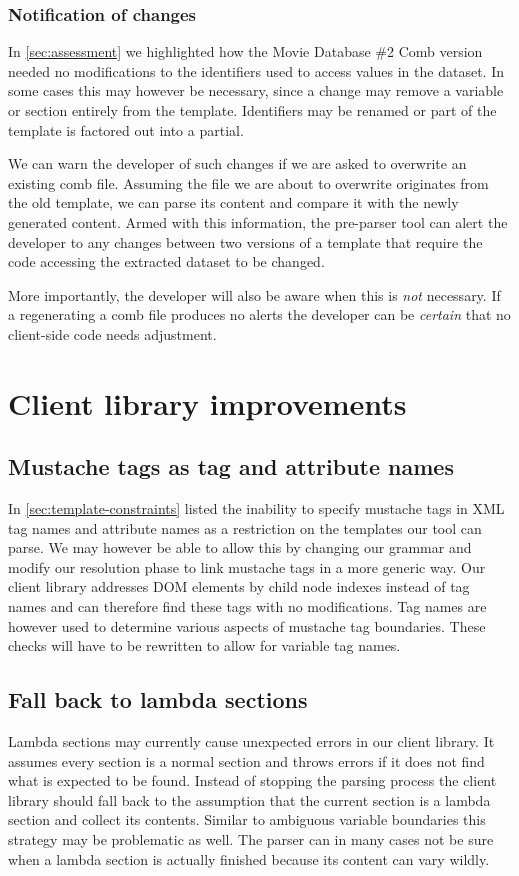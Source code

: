 \documentclass[thesis.tex]{subfiles}
\begin{document}
\subsubsection{Notification of changes}
In \ref{sec:assessment} we highlighted how the Movie Database \#2 Comb version
needed no modifications to the identifiers used to access values in the dataset.
In some cases this may however be necessary, since a change may remove
a variable or section entirely from the template. Identifiers may be renamed or
part of the template is factored out into a partial.

We can warn the developer of such changes if we are asked to overwrite an
existing comb file. Assuming the file we are about to overwrite originates from
the old template, we can parse its content and compare it with the newly
generated content. Armed with this information, the pre-parser tool can alert
the developer to any changes between two versions of a template that require the
code accessing the extracted dataset to be changed.

More importantly, the developer will also be aware when this is \emph{not}
necessary. If a regenerating a comb file produces no alerts the developer can
be \emph{certain} that no client-side code needs adjustment.




\section{Client library improvements}

\subsection{Mustache tags as tag and attribute names}
In \ref{sec:template-constraints} listed the inability to specify mustache
tags in XML tag names and attribute names as a restriction on the templates our
tool can parse. We may however be able to allow this by changing our grammar and
modify our resolution phase to link mustache tags in a more generic way.
Our client library addresses DOM elements by child node indexes instead of tag
names and can therefore find these tags with no modifications. Tag names are
however used to determine various aspects of mustache tag boundaries. These
checks will have to be rewritten to allow for variable tag names.

\subsection{Fall back to lambda sections}
Lambda sections may currently cause unexpected errors in our client library.
It assumes every section is a normal section and throws errors if it does not
find what is expected to be found. Instead of stopping the parsing process
the client library should fall back to the assumption that the current section
is a lambda section and collect its contents. Similar to ambiguous variable
boundaries this strategy may be problematic as well. The parser can in many
cases not be sure when a lambda section is actually finished because its content
can vary wildly.
\end{document}
